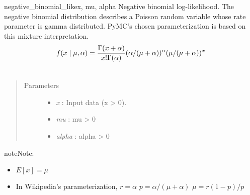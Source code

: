 \hypertarget{pymc.distributions.negative_binomial_like}{}\begin{funcdesc}{negative\_binomial\_like}{x, mu, alpha}
Negative binomial log-likelihood. The negative binomial distribution describes a
Poisson random variable whose rate parameter is gamma distributed. PyMC's chosen
parameterization is based on this mixture interpretation.
\begin{gather}
\begin{split}f(x \mid \mu, \alpha) = \frac{\Gamma(x+\alpha)}{x! \Gamma(\alpha)} (\alpha/(\mu+\alpha))^\alpha (\mu/(\mu+\alpha))^x\end{split}\notag\\\begin{split}\end{split}\notag
\end{gather}\begin{quote}\begin{description}
\item[Parameters] \leavevmode\begin{itemize}
\item {} 
\emph{x} : Input data (x \textgreater{} 0).

\item {} 
\emph{mu} : mu \textgreater{} 0

\item {} 
\emph{alpha} : alpha \textgreater{} 0

\end{itemize}

\end{description}\end{quote}

\begin{notice}{note}{Note:}\begin{itemize}
\item {} 
$E[x]=\mu$

\item {} 
In Wikipedia's parameterization,
$r=\alpha$
$p=\alpha/(\mu+\alpha)$
$\mu=r(1-p)/p$

\end{itemize}
\end{notice}
\end{funcdesc}

